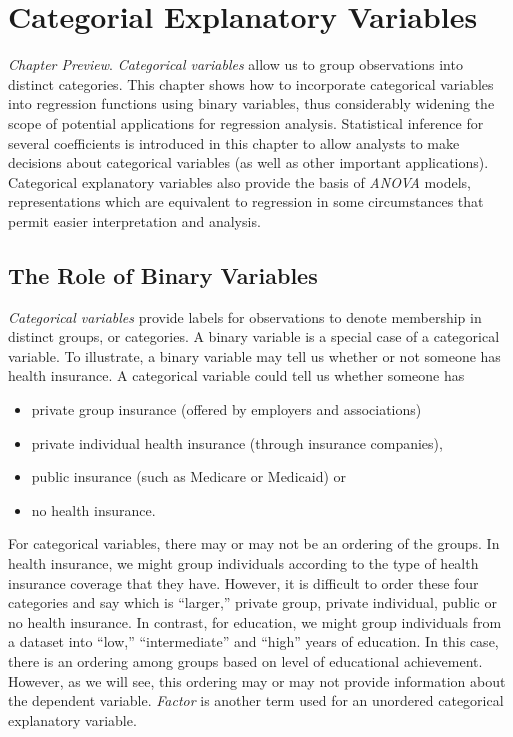 \setcounter{chapter}{3}

\chapter{Categorial Explanatory Variables}


{\small \textit{Chapter Preview}. \textit{Categorical variables}
allow us to group observations into distinct categories. This
chapter shows how to incorporate categorical variables into
regression functions using binary variables, thus considerably
widening the scope of potential applications for regression
analysis. Statistical inference for several coefficients is
introduced in this chapter to allow analysts to make decisions about
categorical variables (as well as other important applications).
Categorical explanatory variables also provide the basis of
\textit{ANOVA} models, representations which are equivalent to
regression in some circumstances that permit easier interpretation
and analysis.}

\section{The Role of Binary Variables}\label{S4:BinaryVar}

\textit{Categorical variables} provide labels for observations to
denote membership in distinct groups, or categories. A binary
variable is a special case of a categorical variable. To illustrate,
a binary variable may tell us whether or not someone has health
insurance. A categorical variable could tell us whether someone has
\begin{itemize}
\item private group insurance (offered by employers and
associations) \item private individual health insurance (through
insurance companies), \item public insurance (such as Medicare or
Medicaid) or \item no health insurance.
\end{itemize}

For categorical variables, there may or may not be an ordering of
the groups. In health insurance, we might group individuals
according to the type of health insurance coverage that they have.
However, it is difficult to order these four categories and say
which is ``larger,'' private group, private individual, public or no
health insurance. In contrast, for education, we might group
individuals from a dataset into ``low,'' ``intermediate'' and
``high'' years of education. In this case, there is an ordering
among groups based on level of educational achievement. However, as
we will see, this ordering may or may not provide information about
the dependent variable. \textit{Factor} is another term used for an
unordered categorical explanatory variable.

